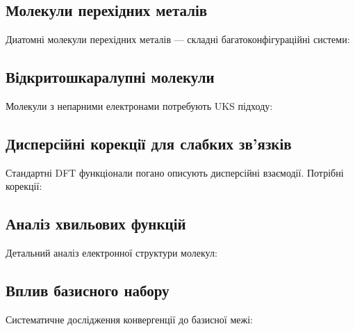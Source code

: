 
\subsection{Молекули перехідних металів}

Диатомні молекули перехідних металів --- складні багатоконфігураційні системи:


\subsection{Відкритошкаралупні молекули}

Молекули з непарними електронами потребують UKS підходу:


\subsection{Дисперсійні корекції для слабких зв'язків}

Стандартні DFT функціонали погано описують дисперсійні взаємодії. Потрібні корекції:


\subsection{Аналіз хвильових функцій}

Детальний аналіз електронної структури молекул:


\subsection{Вплив базисного набору}

Систематичне дослідження конвергенції до базисної межі:

